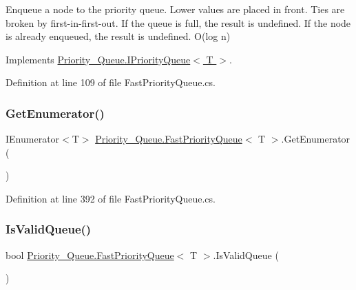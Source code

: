 Enqueue a node to the priority queue. Lower values are placed in front. Ties are broken by first-\/in-\/first-\/out. If the queue is full, the result is undefined. If the node is already enqueued, the result is undefined. O(log n) 



Implements \hyperlink{interface_priority___queue_1_1_i_priority_queue_ab9de1e02c2861409b9ee7ee2b0935840}{Priority\+\_\+\+Queue.\+I\+Priority\+Queue$<$ T $>$}.



Definition at line 109 of file Fast\+Priority\+Queue.\+cs.

\mbox{\label{class_priority___queue_1_1_fast_priority_queue_a6bc93c974be3bd97fbce99478a2bca46}} 
\subsubsection{\texorpdfstring{Get\+Enumerator()}{GetEnumerator()}}
{\footnotesize\ttfamily I\+Enumerator$<$T$>$ \hyperlink{class_priority___queue_1_1_fast_priority_queue}{Priority\+\_\+\+Queue.\+Fast\+Priority\+Queue}$<$ T $>$.Get\+Enumerator (\begin{DoxyParamCaption}{ }\end{DoxyParamCaption})}



Definition at line 392 of file Fast\+Priority\+Queue.\+cs.

\mbox{\label{class_priority___queue_1_1_fast_priority_queue_ae0ac5139a5b545e75808a4173a8777d6}} 
\subsubsection{\texorpdfstring{Is\+Valid\+Queue()}{IsValidQueue()}}
{\footnotesize\ttfamily bool \hyperlink{class_priority___queue_1_1_fast_priority_queue}{Priority\+\_\+\+Queue.\+Fast\+Priority\+Queue}$<$ T $>$.Is\+Valid\+Queue (\begin{DoxyParamCaption}{ }\end{DoxyParamCaption})}



